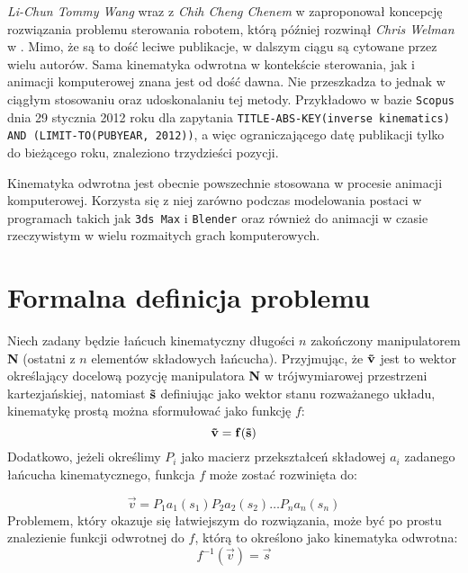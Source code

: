 \documentclass[11pt]{mwrep}
\begin{document}
  \textit{Li-Chun Tommy Wang} wraz z \textit{Chih Cheng Chenem} w \cite{ikrobot} zaproponował koncepcję rozwiązania problemu sterowania robotem, którą później rozwinął \textit{Chris Welman} w \cite{welman}. Mimo, że są to dość leciwe publikacje, w dalszym ciągu są cytowane przez wielu autorów. Sama kinematyka odwrotna w kontekście sterowania, jak i animacji komputerowej znana jest od dość dawna. Nie przeszkadza to jednak w ciągłym stosowaniu oraz udoskonalaniu tej metody. Przykładowo w bazie \texttt{Scopus} dnia 29 stycznia 2012 roku dla zapytania \verb|TITLE-ABS-KEY(inverse kinematics) AND (LIMIT-TO(PUBYEAR, 2012))|, a więc ograniczającego datę publikacji tylko do bieżącego roku, znaleziono trzydzieści pozycji.

  Kinematyka odwrotna jest obecnie powszechnie stosowana w procesie animacji komputerowej. Korzysta się z niej zarówno podczas modelowania postaci w programach takich jak \texttt{3ds Max} i \texttt{Blender} oraz również do animacji w czasie rzeczywistym w wielu rozmaitych grach komputerowych.
  
\section{Formalna definicja problemu}

 Niech zadany będzie łańcuch kinematyczny długości $n$ zakończony manipulatorem \textbf{N} (ostatni z $n$ elementów składowych łańcucha). Przyjmując, że $\bf\vec{v}$ jest to wektor określający docelową pozycję manipulatora \textbf{N} w trójwymiarowej przestrzeni kartezjańskiej, natomiast $\bf\vec{s}$ definiując jako wektor stanu rozważanego układu, kinematykę prostą można sformułować jako funkcję $f$:
$$
\bf\vec{v} = f(\bf\vec{s})
$$
Dodatkowo, jeżeli określimy $P_i$ jako macierz przekształceń składowej $a_i$ zadanego łańcucha kinematycznego, funkcja $f$ może zostać rozwinięta do:

$$
{\vec{v}} = P_1a_1({s_1})P_2a_2({s_2}) \dots P_na_n({s_n})
$$
Problemem, który okazuje się łatwiejszym do rozwiązania, może być po prostu znalezienie funkcji odwrotnej do $f$, którą to określono jako kinematyka odwrotna:
\nopagebreak
$$
f^{-1} (\vec{v})  = \vec{s}
$$
\end{document}
